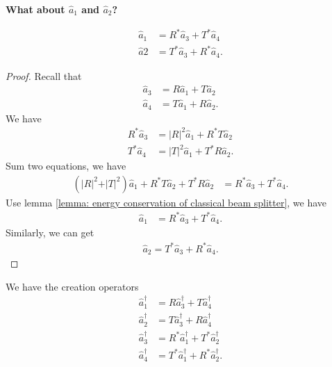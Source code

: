 \documentclass[../../note.tex]{subfiles}
\begin{document}
\textbf{What about $\hat{a}_1$ and $\hat{a}_2$?}
\begin{lemma}
    \begin{align}
        \hat{a}_1
        &= R^\ast \hat{a}_3 + T^\ast \hat{a}_4 \\
        \hat{a}{2}
        &= T^\ast \hat{a}_3 + R^\ast \hat{a}_4.
    \end{align}
\end{lemma}
\begin{proof}
    Recall that 
    \begin{align}
        \hat{a}_3 
        &= R \hat{a}_1 + T \hat{a}_2 \\
        \hat{a}_4 
        &= T \hat{a}_1 + R \hat{a}_2.
    \end{align}
    We have
    \begin{align}
        R^\ast \hat{a}_3
        &= \vert R \vert^2 \hat{a}_1 + R^\ast T \hat{a}_2 \\
        T^\ast \hat{a}_4 
        &= \vert T \vert^2 \hat{a}_1 + T^\ast R \hat{a}_2.
    \end{align}
    Sum two equations, we have
    \begin{align}
        (\vert R \vert^2 + \vert T \vert^2) \hat{a}_1 + R^\ast T \hat{a}_2 + T^\ast R \hat{a}_2 
        &= R^\ast \hat{a}_3 + T^\ast \hat{a}_4.
    \end{align}
    Use lemma \ref{lemma: energy conservation of classical beam splitter}, we have
    \begin{align}
        \hat{a}_1
        &= R^\ast \hat{a}_3 + T^\ast \hat{a}_4.
    \end{align}
    Similarly, we can get
    \begin{align}
        \hat{a}_2 = T^\ast \hat{a}_3 + R^\ast \hat{a}_4.
    \end{align}
\end{proof}

\begin{lemma}
    We have the creation operators
    \begin{align}
        \hat{a}_1^\dagger 
        &= R \hat{a}_3^\dagger + T \hat{a}_4^\dagger \\
        \hat{a}_2^\dagger
        &= T \hat{a}_3^\dagger + R \hat{a}_4^\dagger \\
        \hat{a}_3^\dagger
        &= R^\ast \hat{a}_1^\dagger + T^\ast \hat{a}_2^\dagger \\
        \hat{a}_4^\dagger
        &= T^\ast \hat{a}_1^\dagger + R^\ast \hat{a}_2^\dagger.
    \end{align}
\end{lemma}
\end{document}
